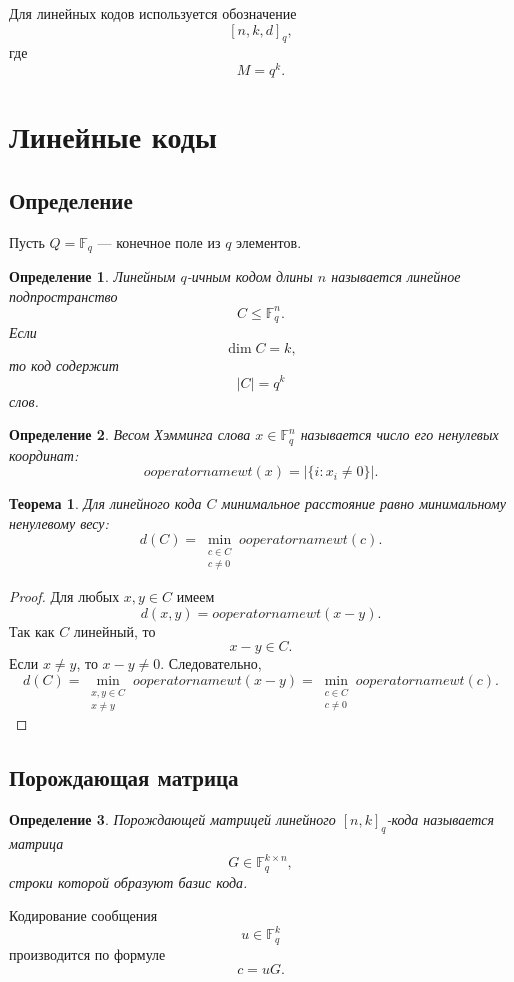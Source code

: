 \documentclass[12pt,a4paper]{article}
\newtheorem{definition}{Определение}[section]
\newtheorem{theorem}{Теорема}[section]
\newcommand{\F}{\mathbb{F}}
\newcommand{\wt}{ooperatorname{wt}}
\begin{document}
Для линейных кодов используется обозначение
\[
    [n,k,d]_q,
\]
где
\[
    M=q^k.
\]

\section{Линейные коды}

\subsection{Определение}

Пусть $Q=\F_q$ --- конечное поле из $q$ элементов.

\begin{definition}
Линейным $q$-ичным кодом длины $n$ называется линейное подпространство
\[
    C\le \F_q^n.
\]
Если
\[
    \dim C=k,
\]
то код содержит
\[
    |C|=q^k
\]
слов.
\end{definition}

\begin{definition}
Весом Хэмминга слова $x\in \F_q^n$ называется число его ненулевых координат:
\[
    \wt(x)=|\{i:x_i\ne 0\}|.
\]
\end{definition}

\begin{theorem}
Для линейного кода $C$ минимальное расстояние равно минимальному ненулевому весу:
\[
    d(C)=\min_{\substack{c\in C\\c\ne 0}}\wt(c).
\]
\end{theorem}

\begin{proof}
Для любых $x,y\in C$ имеем
\[
    d(x,y)=\wt(x-y).
\]
Так как $C$ линейный, то
\[
    x-y\in C.
\]
Если $x\ne y$, то $x-y\ne 0$.
Следовательно,
\[
    d(C)
    =
    \min_{\substack{x,y\in C\\x\ne y}}\wt(x-y)
    =
    \min_{\substack{c\in C\\c\ne 0}}\wt(c).
\]
\end{proof}

\subsection{Порождающая матрица}

\begin{definition}
Порождающей матрицей линейного $[n,k]_q$-кода называется матрица
\[
    G\in \F_q^{k\times n},
\]
строки которой образуют базис кода.
\end{definition}

Кодирование сообщения
\[
    u\in \F_q^k
\]
производится по формуле
\[
    c=uG.
\]
\end{document}
